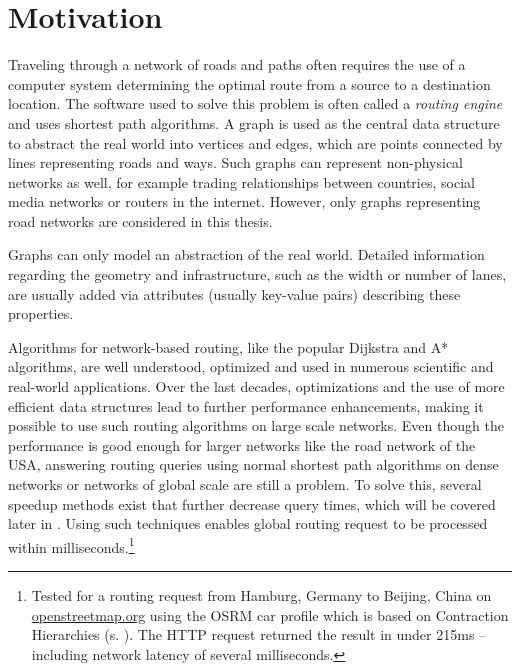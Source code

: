 
\section{Motivation}
	
	Traveling through a network of roads and paths often requires the use of a computer system determining the optimal route from a source to a destination location.
	The software used to solve this problem is often called a \emph{routing engine} and uses shortest path algorithms.
	A graph is used as the central data structure to abstract the real world into vertices and edges, which are points connected by lines representing roads and ways.
	Such graphs can represent non-physical networks as well, for example trading relationships between countries, social media networks or routers in the internet.
	However, only graphs representing road networks are considered in this thesis.
	
	Graphs can only model an abstraction of the real world.
	Detailed information regarding the geometry and infrastructure, such as the width or number of lanes, are usually added via attributes (usually key-value pairs) describing these properties.
	
	Algorithms for network-based routing, like the popular Dijkstra and A* algorithms, are well understood, optimized and used in numerous scientific and real-world applications.
	Over the last decades, optimizations and the use of more efficient data structures lead to further performance enhancements, making it possible to use such routing algorithms on large scale networks.
	Even though the performance is good enough for larger networks like the road network of the USA\cite{aviram-optimizing-dijkstra}, answering routing queries using normal shortest path algorithms on dense networks or networks of global scale are still a problem.
	To solve this, several speedup methods exist that further decrease query times, which will be covered later in .
	Using such techniques enables global routing request to be processed within milliseconds.\footnote{Tested for a routing request from Hamburg, Germany to Beijing, China on \href{https://www.openstreetmap.org/directions?engine=fossgis\_osrm\_car&route=53.55\%2C10.00\%3B39.91\%2C116.39}{openstreetmap.org} using the OSRM car profile which is based on Contraction Hierarchies (s. ). The HTTP request returned the result in under 215ms -- including network latency of several milliseconds.}
	
